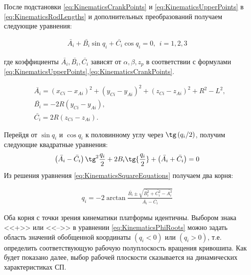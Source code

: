 После подстановки \ref{eq:KinematicsCrankPoints} и \ref{eq:KinematicsUpperPoints} в \ref{eq:KinematicsRodLengths} и дополнительных преобразований получаем следующие уравнения:

\begin{equation}
\label{eq:KinematicsDriveAnglesFromPosEq}
\begin{aligned}
\bar{A_i} + \bar{B_i}\sin{q_i} + \bar{C_i}\cos{q_i} = 0,~~i = 1,2,3
\end{aligned}
\end{equation}

где коэффициенты $\bar{A_i}, \bar{B_i}, \bar{C_i}$ зависят от $\alpha, \beta, z_p$ в соответствии с формулами \ref{eq:KinematicsUpperPoints},\ref{eq:KinematicsCrankPoints}.

\begin{equation}
\label{eq:KinematicsSquareEqKoefficients}
\begin{aligned}
	& \bar{A_i} = (x_{Ci} - x_{Ai})^2 + (y_{Ci} - y_{Ai})^2 + (z_{Ci} - z_{Ai})^2 + R^2 - L^2,\\
	& \bar{B_i} = -2R(y_{Ci} - y_{Ai}),\\
	& \bar{C_i} = 2R(z_{Ci} - z_{Ai}).
\end{aligned}
\end{equation}

Перейдя от $\sin{q_i}$ и $\cos{q_i}$ к половинному углу через $\tg\left({q_i/2}\right)$, получим следующие квадратные уравнения:
\begin{equation}
\label{eq:KinematicsSquareEquations}
\begin{aligned}
	\left(\bar{A_i}-\bar{C_i}\right)\tg^2{\frac{q_i}{2}} + 2B_i\tg{\frac{q_i}{2}} + \left(\bar{A_i}+\bar{C_i}\right)=0
\end{aligned}
\end{equation}
Из решения уравнения \ref{eq:KinematicsSquareEquations} получаем два корня:

\begin{equation}
\label{eq:KinematicsPhiRoots}
\begin{aligned}
	q_i = -2\arctan\frac{\bar{B_i}\pm\sqrt{\bar{B_i^2} + \bar{C_i^2} - \bar{A_i^2}}}{\bar{A_i} - \bar{C_i}}
\end{aligned}
\end{equation}

Оба корня с точки зрения кинематики платформы идентичны. Выбором знака <<+>> или <<-->> в уравнении \ref{eq:KinematicsPhiRoots} можно задать область значений обобщенной координаты $(q_i < 0)$ или $(q_i > 0)$, т.е. определить соответствующую рабочую полуплоскость вращения кривошипа. Как будет показано далее, выбор рабочей плоскости сказывается на динамических характеристиках СП.


